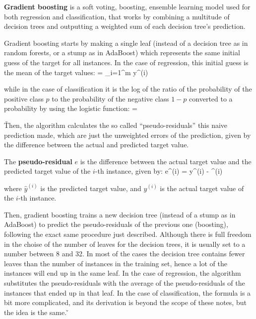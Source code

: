 \textbf{Gradient boosting} is a soft voting, boosting, ensemble learning model used for both regression and
classification, that works by combining a multitude of decision trees and outputting a weighted sum of each decision
tree's prediction.
\ed

Gradient boosting starts by making a single leaf (instead of a decision tree as in random forests, or a stump as in
AdaBoost) which represents the same initial guess of the target for all instances. In the case of regression, this
initial guess is the mean of the target values:
\bse
{} =  \sum_{i=1}^{m} y^{(i)}
\ese

while in the case of classification it is the log of the ratio of the probability of the positive class $p$ to the
probability of the negative class $1-p$ converted to a probability by using the logistic function:
\bse
{} = 
\ese

\v

Then, the algorithm calculates the so called ``pseudo-residuals'' this naive prediction made, which are just the
unweighted errors of the prediction, given by the difference between the actual and predicted target value.

The \textbf{pseudo-residual} $e$ is the difference between the actual target value and the predicted target value
of the $i$-th instance, given by:
\bse
e^{(i)} = y^{(i)} - ^{(i)}
\ese

where $\hat{y}^{(i)}$ is the predicted target value, and $y^{(i)}$ is the actual target value of the $i$-th instance.
\ed

Then, gradient boosting trains a new decision tree (instead of a stump as in AdaBoost) to predict the pseudo-residuals
of the previous one (boosting), following the exact same procedure just described. Although there is full freedom in the
choise of the number of leaves for the decision trees, it is usually set to a number between 8 and 32. In most of the
cases the decision tree contains fewer leaves than the number of instances in the training set, hence a lot of the
instances will end up in the same leaf. In the case of regression, the algorithm substitutes the pseudo-residuals with
the average of the pseudo-residuals of the instances that ended up in that leaf. In the case of classification, the
formula is a bit more complicated, and its derivation is beyond the scope of these notes, but the idea is the same. \v

